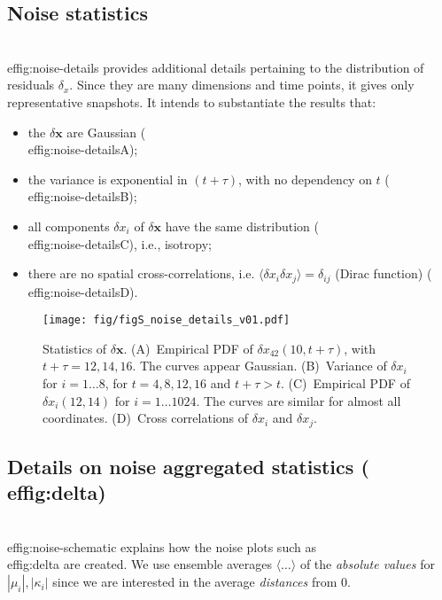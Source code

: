 \documentclass{article} %
\def\vx{{\bm{x}}}
\begin{document}
\subsection{Noise statistics}
\label{app:noise-stat}
\\ef{fig:noise-details} provides additional details pertaining to the distribution of residuals $\delta_x$. 
Since they are many dimensions and time points, it gives only representative snapshots.
It intends to substantiate the results that:
\begin{itemize}
    \item the $\delta \vx$ are Gaussian (\\ef{fig:noise-details}A);
    \item the variance is exponential in $(t+\tau)$, with no dependency on $t$ (\\ef{fig:noise-details}B);
    \item all components $\delta x_i$ of $\delta \vx$ have the same distribution (\\ef{fig:noise-details}C), i.e., isotropy;
    \item there are no spatial cross-correlations, i.e. $\langle \delta x_i \delta x_j \rangle = \delta_{ij}$ (Dirac function) (\\ef{fig:noise-details}D).
\end{itemize} 

\begin{figure}[htbp]
\vskip 0.2in
\begin{center}
\centerline{\texttt{[image: fig/figS\_noise\_details\_v01.pdf]}}
\caption{
Statistics of $\delta \mathbf{x}$.
(A)~Empirical PDF of $\delta x_{42}(10,t+\tau)$, with $t+\tau = 12, 14, 16$.
The curves appear Gaussian.
(B)~Variance of $\delta x_i$ for $i = 1 \dots 8$, for $t = 4,8,12,16$ and $t+\tau > t$.
(C)~Empirical PDF of $\delta x_i (12, 14)$ for $i=1 \dots 1024$. The curves are similar for almost all coordinates.
(D)~Cross correlations of $\delta x_i$ and $\delta x_j$.
}
\label{fig:noise-details}
\end{center}
\vskip -0.2in
\end{figure}


\subsection{Details on noise aggregated statistics (\\ef{fig:delta})}

\\ef{fig:noise-schematic} explains how the noise plots such as~\\ef{fig:delta} are created.
We use ensemble averages $\langle \dots \rangle$ of the \emph{absolute values} for $|\mu_i|, |\kappa_i|$ since we are interested in the average \emph{distances} from 0.
\end{document}
